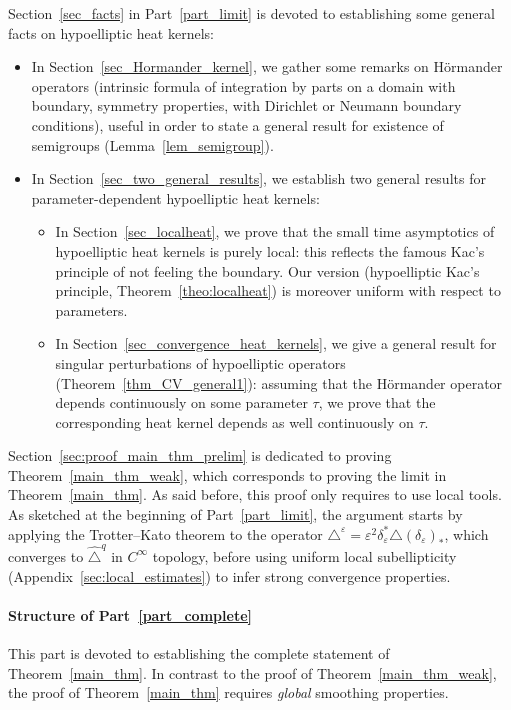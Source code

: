 \documentclass[10pt]{amsart}
\theoremstyle{definition}\newtheorem{defi}[theo]{Definition}\newtheorem{rema}[theo]{Remark}\newtheorem{exam}[theo]{Example}\newtheorem{exem}[theo]{Example}\newtheorem{nota}[theo]{Notation}
\begin{document}
Section~\ref{sec_facts} in Part~\ref{part_limit} is devoted to establishing some general facts on hypoelliptic heat kernels:
\begin{itemize}
\item In Section~\ref{sec_Hormander_kernel}, we gather some remarks on H\"ormander operators (intrinsic formula of integration by parts on a domain with boundary, symmetry properties, with Dirichlet or Neumann boundary conditions), useful in order to state a general result for existence of semigroups (Lemma~\ref{lem_semigroup}).
\item In Section~\ref{sec_two_general_results}, we establish two general results for parameter-dependent hypoelliptic heat kernels:
\begin{itemize}
\item In Section~\ref{sec_localheat}, we prove that the small time asymptotics of hypoelliptic heat kernels is purely local: this reflects the famous Kac's principle of not feeling the boundary. Our version (hypoelliptic Kac's principle, Theorem~\ref{theo:localheat}) is moreover uniform with respect to parameters.
\item In Section~\ref{sec_convergence_heat_kernels}, we give a general result for singular perturbations of hypoelliptic operators (Theorem~\ref{thm_CV_general1}): assuming that the H\"ormander operator depends continuously on some parameter $\tau$, we prove that the corresponding heat kernel depends as well continuously on $\tau$.
\end{itemize}
\end{itemize}
%

Section~\ref{sec:proof_main_thm_prelim} is dedicated to proving Theorem~\ref{main_thm_weak}, which corresponds to proving the limit in Theorem~\ref{main_thm}. As said before, this proof only requires to use local tools. As sketched at the beginning of Part~\ref{part_limit}, the argument starts by applying the Trotter--Kato theorem to the operator $\triangle^\varepsilon = \varepsilon^2 \delta_\varepsilon^*\triangle(\delta_\varepsilon)_*$, which converges to $\widehat{\triangle}^{q}$ in $C^\infty$ topology, before using uniform local subellipticity (Appendix~\ref{sec:local_estimates}) to infer strong convergence properties.


\goodbreak
\paragraph{Structure of Part~\ref{part_complete}}
This part is devoted to establishing the complete statement of Theorem~\ref{main_thm}. In contrast to the proof of Theorem~\ref{main_thm_weak}, the proof of Theorem~\ref{main_thm} requires \emph{global} smoothing properties.
\end{document}
